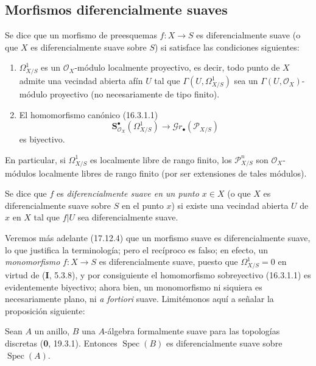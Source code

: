 \subsection{Morfismos diferencialmente suaves}
\label{IV.16.10}

\begin{definition}[16.10.1]
\label{IV.16.10.1}
Se dice que un morfismo de preesquemas $f:X\to S$ es
diferencialmente suave (o que $X$ es diferencialmente
suave sobre $S$) si satisface las condiciones siguientes:
\begin{enumerate}
  \item[\textup{(i)}] $\varOmega_{X/S}^1$ es un $\mathcal{O}_X$-módulo localmente
  proyectivo, es decir, todo punto de $X$ admite una vecindad abierta
  afín $U$ tal que $\Gamma(U,\varOmega_{X/S}^1)$ sea un
  $\Gamma(U,\mathcal{O}_X)$-módulo proyectivo (no necesariamente de tipo
  finito).
  \item[\textup{(ii)}] El homomorfismo canónico \textup{(16.3.1.1)}
  \[
    \mathbf{S}_{\mathcal{O}_X}^{\bullet}(\varOmega_{X/S}^1)
    \longrightarrow\mathscr{G}r_{\bullet}(\mathscr{P}_{X/S})
  \]
  es biyectivo.
\end{enumerate}
En particular, si $\varOmega_{X/S}^1$ es localmente libre de rango finito, los
$\mathscr{P}_{X/S}^n$ son $\mathcal{O}_X$-módulos localmente libres de
rango finito \textup{(por ser extensiones de tales módulos)}.
\end{definition}

Se dice que $f$ es \emph{diferencialmente suave en un punto $x\in X$} (o
que $X$ es diferencialmente suave sobre $S$ en el punto $x$) si existe una
vecindad abierta $U$ de $x$ en $X$ tal que $f|U$ sea diferencialmente
suave.

Veremos más adelante (17.12.4) que un morfismo suave es diferencialmente
suave, lo que justifica la terminología; pero el recíproco es falso; en
efecto, un \emph{monomorfismo} $f:X\to S$ es diferencialmente suave,
puesto que $\varOmega_{X/S}^1=0$ en virtud de (\textbf I, 5.3.8), y por consiguiente
el homomorfismo sobreyectivo (16.3.1.1) es evidentemente biyectivo; ahora
bien, un monomorfismo ni siquiera es necesariamente plano, ni \emph{a fortiori}
suave. Limitémonos aquí a señalar la proposición siguiente:

\begin{proposition}[16.10.2]
\label{IV.16.10.2}
Sean $A$ un anillo, $B$ una $A$-álgebra formalmente suave para las
topologías discretas \textup{(\textbf 0, 19.3.1)}. Entonces $\operatorname{Spec}(B)$ es
diferencialmente suave sobre $\operatorname{Spec}(A)$.
\end{proposition}


